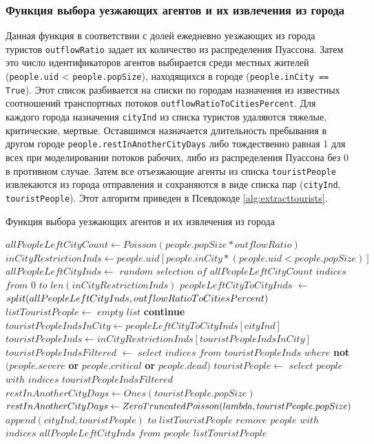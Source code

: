 \documentclass[a4paper,12pt]{article} %
\begin{document}
\subsubsection{Функция выбора уезжающих агентов и их извлечения из города}
Данная функция в соответствии с долей ежедневно уезжающих из города туристов \texttt{outflowRatio} задает их количество из распределения Пуассона. Затем это число идентификаторов агентов выбирается среди местных жителей (\texttt{people.uid} < \texttt{people.pop\-Size}), находящихся в городе (\texttt{people.inCity == True}). Этот список разбивается на списки по городам назначения из известных соотношений транспортных потоков \texttt{outflow\-RatioToCitiesPercent}. Для каждого города назначения \texttt{cityInd} из списка туристов удаляются тяжелые, критические, мертвые. Оставшимся назначается длительность пребывания в другом городе \texttt{people.restInAnotherCityDays} либо тождественно равная 1 для всех при моделировании потоков рабочих, либо из распределения Пуассона без 0 в противном случае. Затем все отъезжающие агенты из списка \texttt{touristPeople} извлекаются из города отправления и сохраняются в виде списка пар (\texttt{cityInd}, \texttt{touristPeople}). Этот алгоритм приведен в Псевдокоде \ref{alg:extracttourists}.

\begin{algorithm}[H]
\caption{Функция выбора уезжающих агентов и их извлечения из города}
\label{alg:extracttourists}
\begin{algorithmic}[1]
	\State \( allPeopleLeftCityCount \gets Poisson(people.popSize * outflowRatio) \)
	\State \( inCityRestrictionInds \gets people.uid[people.inCity * (people.uid < people.popSize)]\)
	\State \( allPeopleLeftCityInds \gets \) \(random\) \(selection\) \(of\) \(allPeopleLeftCityCount\) \(indices\) \(from\) \(0\) \(to\) \(len(inCityRestrictionInds)\)
	\State \( peopleLeftCityToCityInds \) \(\gets\) \(split(allPeopleLeftCityInds,outflowRatioToCities\-Percent) \)
	\State \( listTouristPeople \gets\) \(empty\) \(list \)
			\State \textbf{continue}
		\EndIf
		\State \( touristPeopleIndsInCity \gets peopleLeftCityToCityInds[cityInd] \)
		\State \( touristPeopleInds \gets inCityRestrictionInds[touristPeopleIndsInCity] \)
		\State \( touristPeopleIndsFiltered\) \( \gets \) \( select \) \( indices \) \( from \) \( touristPeopleInds \) \( where \) \textbf{not} \( (people.severe \) \textbf{or} \( people.critical \) \textbf{or} \( people.dead) \)
		\State \( touristPeople \gets \) \(select\) \(people\) \(with\) \(indices\) \(touristPeopleIndsFiltered \)
			\State \( restInAnotherCityDays \gets Ones(touristPeople.popSize) \)
		\Else
			\State \( restInAnotherCityDays \gets ZeroTruncatedPoisson(lambda, touristPeople.pop\-Size) \)
		\EndIf
		\State \( append(cityInd, touristPeople) \) \(to\) \(listTouristPeople \)
	\EndFor
	\State \(remove\) \(people\) \(with\) \(indices\) \(allPeopleLeftCityInds\) \(from\) \(people \)
	\State \Return \( listTouristPeople \)	
\EndFunction	
\end{algorithmic}
\end{algorithm}
\end{document}
